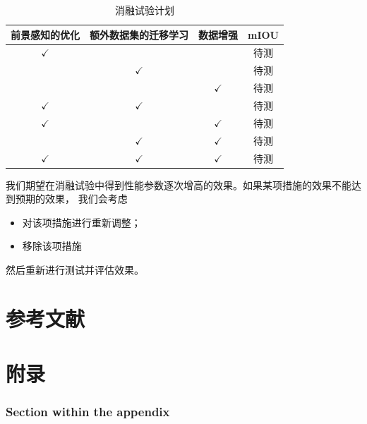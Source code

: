 \documentclass[a4paper,twoside,zihao=5,UTF8]{ctexrep}
\begin{document}
\begin{table}[htbp]
    \centering
    \caption{消融试验计划}
    \label{tbl:ablexpr}
    \renewcommand\arraystretch{1.5}
    \begin{tabular}{ccc|c}
        \toprule
        \hline
        前景感知的优化 & 额外数据集的迁移学习 & 数据增强 & mIOU\\
        \hline
        $\checkmark$ & \ & \ & 待测 \\
        \ & $\checkmark$ & \ & 待测  \\
        \ & \ & $\checkmark$ & 待测  \\
        $\checkmark$ & $\checkmark$ & \ & 待测  \\
        $\checkmark$ & \ & $\checkmark$ & 待测  \\
        \ & $\checkmark$ & $\checkmark$ & 待测  \\
        $\checkmark$ & $\checkmark$ & $\checkmark$ & 待测 \\
        \hline
        \bottomrule
    \end{tabular}
\end{table}

我们期望在消融试验中得到性能参数逐次增高的效果。如果某项措施的效果不能达到预期的效果，
我们会考虑
\begin{itemize}
    \item 对该项措施进行重新调整；
    \item 移除该项措施
\end{itemize}
然后重新进行测试并评估效果。

\part*{参考文献}




\appendix
\part*{附录}

\section*{Section within the appendix}
\blindtext
\end{document}
